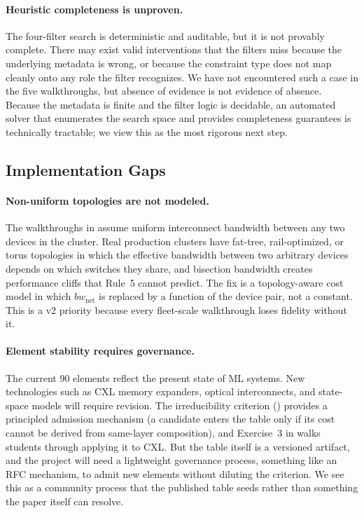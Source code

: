 \documentclass[10pt,twocolumn]{article}
\begin{document}
\paragraph{Heuristic completeness is unproven.} The four-filter search is deterministic and auditable, but it is not provably complete. There may exist valid interventions that the filters miss because the underlying metadata is wrong, or because the constraint type does not map cleanly onto any role the filter recognizes. We have not encountered such a case in the five walkthroughs, but absence of evidence is not evidence of absence. Because the metadata is finite and the filter logic is decidable, an automated solver that enumerates the search space and provides completeness guarantees is technically tractable; we view this as the most rigorous next step.

\subsection{Implementation Gaps}


\paragraph{Non-uniform topologies are not modeled.} The walkthroughs in  assume uniform interconnect bandwidth between any two devices in the cluster. Real production clusters have fat-tree, rail-optimized, or torus topologies in which the effective bandwidth between two arbitrary devices depends on which switches they share, and bisection bandwidth creates performance cliffs that Rule~5 cannot predict. The fix is a topology-aware cost model in which $bw_{\text{net}}$ is replaced by a function of the device pair, not a constant. This is a v2 priority because every fleet-scale walkthrough loses fidelity without it.

\paragraph{Element stability requires governance.} The current 90 elements reflect the present state of ML systems. New technologies such as CXL memory expanders, optical interconnects, and state-space models will require revision. The irreducibility criterion () provides a principled admission mechanism (a candidate enters the table only if its cost cannot be derived from same-layer composition), and Exercise~3 in  walks students through applying it to CXL. But the table itself is a versioned artifact, and the project will need a lightweight governance process, something like an RFC mechanism, to admit new elements without diluting the criterion. We see this as a community process that the published table seeds rather than something the paper itself can resolve.
\end{document}
